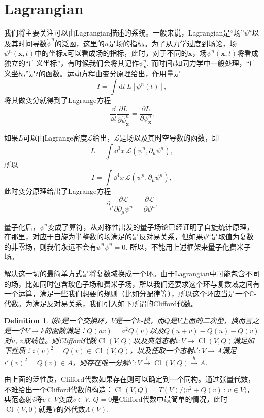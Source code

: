 \documentclass[11pt]{article}
\theoremstyle{definition}
\theoremstyle{plain}
\newtheorem{defi}[para]{Definition}
\newcommand{\pfrac}[2]{\frac{\partial #1}{\partial #2}}
\begin{document}
\section{Lagrangian}

我们将主要关注可以由Lagrangian描述的系统。一般来说，Lagrangian是“场”$\psi^n$以及其时间导数$\dot\psi^n$的泛函，这里的$n$是场的指标。为了从力学过度到场论，场$\psi^n(\mathbf x,t)$中的坐标$\mathbf x$可以看成场的指标，此时，对于不同的$\mathbf x$，场$\psi^n(\mathbf x,t)$将看成独立的“广义坐标”，有时候我们会将其记作$\psi^n_{\mathbf x}$. 而时间$t$如同力学中一般处理，“广义坐标”是$t$的函数。运动方程由变分原理给出，作用量是
\[
	I=\int \mathrm d t\, L[\psi^n(t)],
\]
将其做变分就得到了Lagrange方程
\[
	\frac{\dd}{\dd t}\pfrac L{\dot\psi^n_{\mathbf x}}=\pfrac L{\psi^n_{\mathbf x}}.
\]

如果$L$可以由Lagrange密度$\mathcal L$给出，$\mathcal L$是场以及其时空导数的函数，即
\[
	L=\int\dd^3 x \, \mathcal L(\psi^n,\partial_\mu\psi^n),
\]
所以
\[
	I=\int \dd^4 x\, \mathcal L(\psi^n,\partial_\mu\psi^n),
\]
此时变分原理给出了Lagrange方程
\[
	\partial_\mu\pfrac{\mathcal L}{\partial_\mu \psi^n}=\pfrac{\mathcal L}{\psi^n}.
\]

量子化后，$\psi^n$变成了算符，从对称性出发的量子场论已经证明了自旋统计原理，在那里，对应于自旋为半整数的场满足的是反对易关系，但如果$\psi^n$是取值为复数的非零场，则我们永远不会有$\psi^n\psi^n=0$. 所以，不能用上述框架来量子化费米子场。

解决这一切的最简单方式是将复数域换成一个环。由于Lagrangian中可能包含不同的场，比如同时包含玻色子场和费米子场，所以我们还要求这个环与复数域之间有一个运算，满足一些我们想要的规则（比如分配律等），所以这个环应当是一个$\mathbb C$-代数。为满足反对易关系，我们引入如下所谓的Clifford代数。

\begin{defi}
	设$k$是一个交换环，$V$是一个$k$-模，而$Q$是$V$上面的二次型，换而言之是一个$V\to k$的函数满足：$Q(av)=a^2Q(v)$以及$Q(u+v)-Q(u)-Q(v)$对$u$, $v$双线性。则Clifford代数$\operatorname{Cl}(V,Q)$以及典范态射$i:V\to \operatorname{Cl}(V,Q)$满足如下性质：$i(v)^2=Q(v)\in\operatorname{Cl}(V,Q)$，以及任取一个态射$i':V\to A$满足$i'(v)^2=Q(v)\in A$，则存在唯一分解$i':V\xrightarrow{i} \operatorname{Cl}(V,Q)\xrightarrow{h}A$.
\end{defi}

由上面的泛性质，Clifford代数如果存在则可以确定到一个同构。通过张量代数，不难给出一个Clifford代数的构造：$\operatorname{Cl}(V,Q)=T(V)/\langle v^2+Q(v)\,:\,v\in V\rangle$，典范态射$i$将$v\in V$变成$v\in V$. $Q=0$是Clifford代数中最简单的情况，此时$\operatorname{Cl}(V,0)$就是$V$的外代数$\Lambda(V)$.
\end{document}
